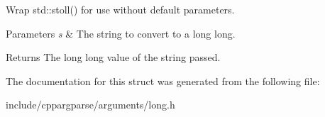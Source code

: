 Wrap std\+::stoll() for use without default parameters. 


\begin{DoxyParams}{Parameters}
{\em s} & The string to convert to a long long.\\
\hline
\end{DoxyParams}
\begin{DoxyReturn}{Returns}
The long long value of the string passed. 
\end{DoxyReturn}


The documentation for this struct was generated from the following file\+:\begin{DoxyCompactItemize}
\item 
include/cppargparse/arguments/long.\+h\end{DoxyCompactItemize}
